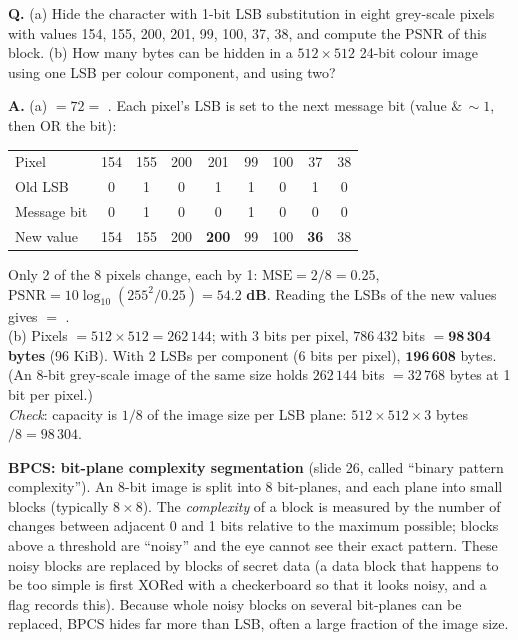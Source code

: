 \begin{worked}
\textbf{Q.} (a) Hide the character  with 1-bit LSB substitution in eight grey-scale pixels with values 154, 155, 200, 201, 99, 100, 37, 38, and compute the PSNR of this block. (b) How many bytes can be hidden in a $512 \times 512$ 24-bit colour image using one LSB per colour component, and using two?

\textbf{A.} (a)  $= 72 = $ . Each pixel's LSB is set to the next message bit (value $\&\,{\sim}1$, then OR the bit):
\begin{center}\small
\setlength{\tabcolsep}{5pt}
\begin{tabular}{@{}lcccccccc@{}}
\toprule
Pixel & 154 & 155 & 200 & 201 & 99 & 100 & 37 & 38\\
Old LSB & 0 & 1 & 0 & 1 & 1 & 0 & 1 & 0\\
Message bit & 0 & 1 & 0 & 0 & 1 & 0 & 0 & 0\\
New value & 154 & 155 & 200 & \textbf{200} & 99 & 100 & \textbf{36} & 38\\
\bottomrule
\end{tabular}
\end{center}
Only 2 of the 8 pixels change, each by 1: $\mathrm{MSE} = 2/8 = 0.25$, $\mathrm{PSNR} = 10\log_{10}(255^2/0.25) = \mathbf{54.2}$ \textbf{dB}. Reading the LSBs of the new values gives  $=$ .\\
(b) Pixels $= 512 \times 512 = 262\,144$; with 3 bits per pixel, $786\,432$ bits $= \mathbf{98\,304}$ \textbf{bytes} (96 KiB). With 2 LSBs per component (6 bits per pixel), $\mathbf{196\,608}$ bytes. (An 8-bit grey-scale image of the same size holds $262\,144$ bits $= 32\,768$ bytes at 1 bit per pixel.)\\
\emph{Check}: capacity is $1/8$ of the image size per LSB plane: $512 \times 512 \times 3$ bytes $/ 8 = 98\,304$.
\end{worked}

\textbf{BPCS: bit-plane complexity segmentation} (slide 26, called ``binary pattern complexity''). An 8-bit image is split into 8 bit-planes, and each plane into small blocks (typically $8 \times 8$). The \emph{complexity} of a block is measured by the number of changes between adjacent 0 and 1 bits relative to the maximum possible; blocks above a threshold are ``noisy'' and the eye cannot see their exact pattern. These noisy blocks are replaced by blocks of secret data (a data block that happens to be too simple is first XORed with a checkerboard so that it looks noisy, and a flag records this). Because whole noisy blocks on several bit-planes can be replaced, BPCS hides far more than LSB, often a large fraction of the image size.

